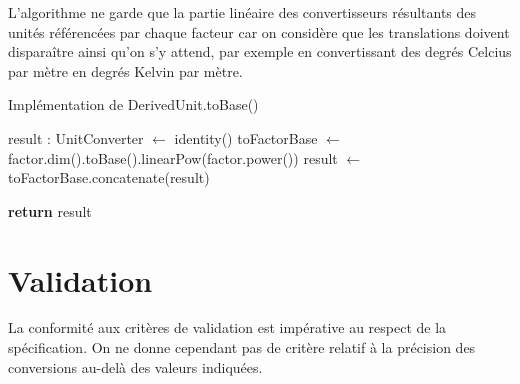 \documentclass[a4paper,draft,twoside,10pt]{article}
\begin{document}
L'algorithme ne garde que la partie linéaire des convertisseurs résultants des unités référencées par chaque facteur car
on considère que les translations doivent disparaître ainsi qu'on s'y attend, par exemple en convertissant des degrés
Celcius par mètre en degrés Kelvin par mètre.

\begin{algorithm}[!h]
\caption{Implémentation de DerivedUnit.toBase()}\label{derivedToBase}
\begin{algorithmic}

\State result : UnitConverter $\gets$ identity()
\State toFactorBase $\gets$ factor.dim().toBase().linearPow(factor.power())
\State result $\gets$ toFactorBase.concatenate(result)
\EndFor

\State \textbf{return} result
\EndProcedure
\end{algorithmic}
\end{algorithm}

\section{Validation}

La conformité aux critères de validation est impérative au respect de la spécification. On ne donne cependant pas de
critère relatif à la précision des conversions au-delà des valeurs indiquées.
\end{document}

